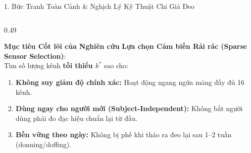 \documentclass[aspectratio=169,10pt]{beamer}
\begin{document}
\begin{frame}{1. Bức Tranh Toàn Cảnh \& Nghịch Lý Kỹ Thuật Chi Giả Đeo}
\begin{columns}[T]
        \begin{column}{0.49\textwidth}
            \begin{exampleblock}{\textbf{Mục tiêu Cốt lõi của Nghiên cứu}}
                \footnotesize
                \textbf{Lựa chọn Cảm biến Rải rác (Sparse Sensor Selection)}:\\
                Tìm số lượng kênh \textbf{tối thiểu $k^*$} sao cho:
                \begin{enumerate}
                    \item \textbf{Không suy giảm độ chính xác:} Hoạt động ngang ngửa mảng đầy đủ 16 kênh.
                    \item \textbf{Dùng ngay cho người mới (Subject-Independent):} Không bắt người dùng phải đo đạc hiệu chuẩn lại từ đầu.
                    \item \textbf{Bền vững theo ngày:} Không bị phế khi tháo ra đeo lại sau 1--2 tuần (donning/doffing).
                \end{enumerate}
            \end{exampleblock}
        \end{column}
    \end{columns}
\end{frame}
\end{document}
